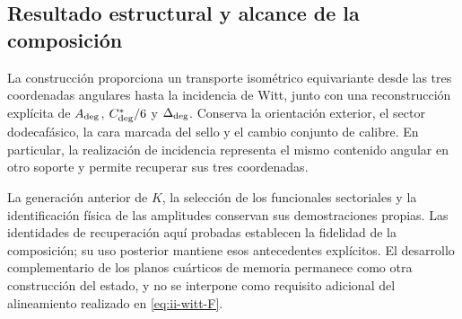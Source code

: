 \subsection{Resultado estructural y alcance de la composición}

La construcción proporciona un transporte isométrico equivariante desde
las tres coordenadas angulares hasta la incidencia de Witt, junto con una
reconstrucción explícita de \(A_{\rm deg}\), \(C^*_{\rm deg}/6\) y
\(\Delta_{\rm deg}\). Conserva la orientación exterior, el sector
dodecafásico, la cara marcada del sello y el cambio conjunto de calibre.
En particular, la realización de incidencia representa el mismo contenido
angular en otro soporte y permite recuperar sus tres coordenadas.

La generación anterior de \(K\), la selección de los funcionales
sectoriales y la identificación física de las amplitudes conservan sus
demostraciones propias. Las identidades de recuperación aquí probadas
establecen la fidelidad de la composición; su uso posterior mantiene
esos antecedentes explícitos. El desarrollo complementario de los planos
cuárticos de memoria permanece como otra construcción del estado, y no
se interpone como requisito adicional del alineamiento realizado en
\eqref{eq:ii-witt-F}.
